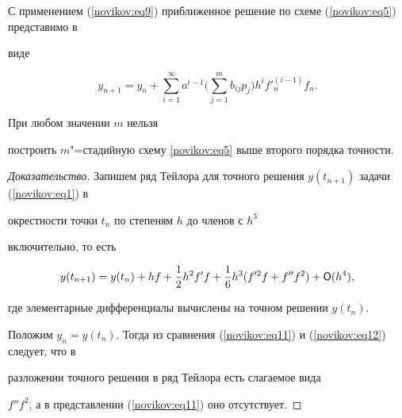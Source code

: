 \smallskip



С применением (\ref{novikov:eq9}) приближенное решение по схеме (\ref{novikov:eq5}) представимо в

виде

\begin{equation}

\label{novikov:eq11}

y_{n+1}=y_n + \sum_{i=1}^\infty a^{i-1}\biggl(\sum_{j=1}^mb_{ij}p_j \biggr)

h^if'^{(i-1)}_nf_n.

\end{equation}



\smallskip



\begin{theorem}  При любом значении $m$  нельзя

построить $m$"=стадийную схему \eqref{novikov:eq5} выше второго порядка точности.

\end{theorem}



\smallskip



\begin{proof}[Доказательство]

Запишем ряд Тейлора для точного решения $y(t_{n+1})$ задачи (\ref{novikov:eq1}) в

окрестности точки $t_n$ по степеням $h$ до членов с $h^3$

включительно, то есть

\begin{equation}

\label{novikov:eq12}

y(t_{n+1})=y(t_n)+hf+\frac{1}{2}h^2f'f+\frac{1}{6}h^3(f'^2f+f''f^2)+{\sf O}(h^4),

\end{equation}

где элементарные дифференциалы вычислены на точном решении $y(t_n)$.

Положим $y_n =y(t_n)$. Тогда из сравнения (\ref{novikov:eq11}) и (\ref{novikov:eq12}) следует, что в

разложении точного решения в ряд Тейлора есть слагаемое вида

$f''f^2$, а в представлении (\ref{novikov:eq11}) оно отсутствует.

\end{proof}



